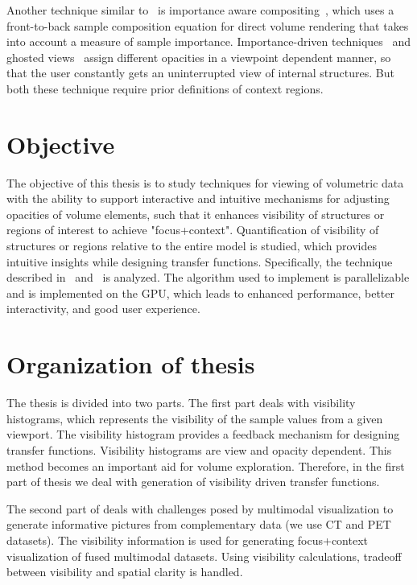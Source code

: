 Another technique similar to~\cite{m} is importance aware compositing~\cite{44}, which uses a front-to-back sample composition equation for direct volume rendering that takes into account a measure of sample importance. Importance-driven techniques~\cite{m} and ghosted views~\cite{h} assign different opacities in a viewpoint dependent manner, so that the user constantly gets an uninterrupted view of internal structures. 
But both these technique require prior definitions of context regions.

\section{Objective}

The objective of this thesis is to study techniques for viewing of volumetric data with the ability to support interactive and intuitive mechanisms for adjusting opacities of volume elements, such that it enhances visibility of structures or regions of interest to achieve "focus+context". Quantification of visibility of structures or regions relative to the entire model is studied, which provides intuitive insights while designing transfer functions. Specifically, the technique described in~\cite{vdtf} and~\cite{mm} is analyzed. The algorithm used to implement is parallelizable and is implemented on the GPU, which leads to enhanced performance, better interactivity, and good user experience. 


\section{Organization of thesis}

The thesis is divided into two parts. The first part deals with visibility histograms, which represents the visibility of the sample values from a given viewport. The visibility histogram provides a feedback mechanism for designing transfer functions. Visibility histograms are view and opacity dependent. This method becomes an important aid for volume exploration. Therefore, in the first part of thesis we deal with generation of visibility driven transfer functions. 

The second part of deals with challenges posed by multimodal visualization to generate informative pictures from complementary data (we use CT and PET datasets). The visibility information is used for generating focus+context visualization of fused multimodal datasets. Using visibility calculations, tradeoff between visibility and spatial clarity is handled. 




